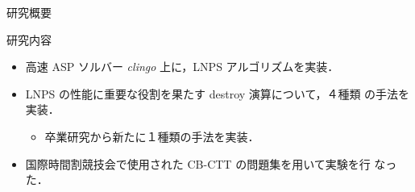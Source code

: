 \documentclass[11pt,dvipdfmx,handout]{beamer}
\begin{document}
\begin{frame}{研究概要}
 \begin{block}{研究内容}
  \begin{itemize}
   \item 高速 ASP ソルバー \textit{clingo} 上に，LNPS アルゴリズムを実装．
   \item LNPS の性能に重要な役割を果たす destroy 演算について，４種類
     の手法を実装．
    \begin{itemize}
     \item 卒業研究から新たに１種類の手法を実装．
    \end{itemize}
   \item 国際時間割競技会で使用された CB-CTT の問題集を用いて実験を行
     なった．
  \end{itemize}
 \end{block}
\end{frame}
\end{document}
